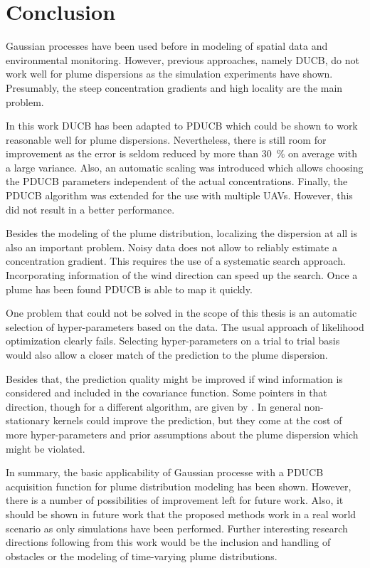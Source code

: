 \chapter{Conclusion}
Gaussian processes have been used before in modeling of spatial data and 
environmental monitoring. However, previous approaches, namely DUCB, do not work 
well for plume dispersions as the simulation experiments have shown. Presumably, 
the steep concentration gradients and high locality are the main problem.

In this work DUCB has been adapted to PDUCB which could be shown to work 
reasonable well for plume dispersions. Nevertheless, there is still room for 
improvement as the error is seldom reduced by more than \SI{30}{\percent} on 
average with a large variance. Also, an automatic scaling was introduced which 
allows choosing the PDUCB parameters independent of the actual concentrations.  
Finally, the PDUCB algorithm was extended for the use with multiple UAVs.  
However, this did not result in a better performance.

Besides the modeling of the plume distribution, localizing the dispersion at 
all is also an important problem. Noisy data does not allow to reliably estimate 
a concentration gradient. This requires the use of a systematic search approach.  
Incorporating information of the wind direction can speed up the search. Once 
a plume has been found PDUCB is able to map it quickly.

One problem that could not be solved in the scope of this thesis is an automatic 
selection of hyper-parameters based on the data. The usual approach of 
likelihood optimization clearly fails. Selecting hyper-parameters on a trial to 
trial basis would also allow a closer match of the prediction to the plume 
dispersion.

Besides that, the prediction quality might be improved if wind information is 
considered and included in the covariance function. Some pointers in that 
direction, though for a different algorithm, are given by 
\textcite{Reggente:2009ti}. In general non-stationary kernels could improve the 
prediction, but they come at the cost of more hyper-parameters and prior 
assumptions about the plume dispersion which might be violated.

In summary, the basic applicability of Gaussian processe with a PDUCB 
acquisition function for plume distribution modeling has been shown. However, 
there is a number of possibilities of improvement left for future work.  Also, 
it should be shown in future work that the proposed methods work in a real world 
scenario as only simulations have been performed. Further interesting research 
directions following from this work would be the inclusion and handling of 
obstacles or the modeling of time-varying plume distributions.


